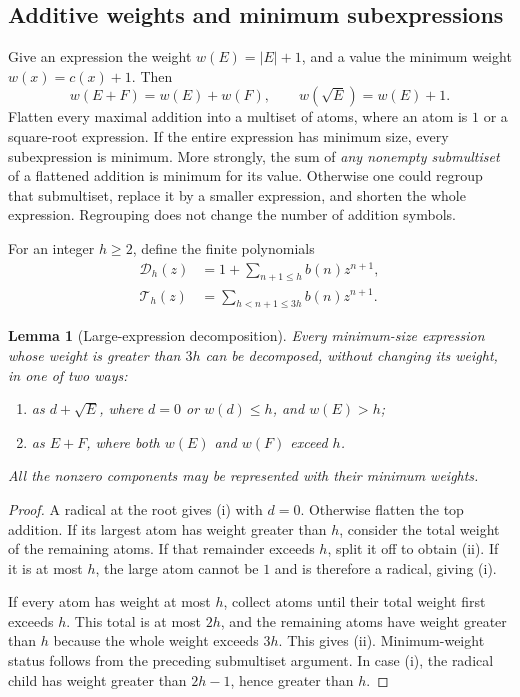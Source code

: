 \documentclass[11pt,letterpaper]{article}
\numberwithin{equation}{section}
\newtheorem{lemma}[theorem]{Lemma}
\theoremstyle{definition}
\begin{document}
\subsection{Additive weights and minimum subexpressions}

Give an expression the weight $w(E)=|E|+1$, and a value the minimum weight
$w(x)=c(x)+1$. Then
\[
 w(E+F)=w(E)+w(F),\qquad w(\sqrt E)=w(E)+1.
\]
Flatten every maximal addition into a multiset of atoms, where an atom is
$1$ or a square-root expression.
If the entire expression has minimum size, every subexpression is minimum.
More strongly, the sum of \emph{any nonempty submultiset} of a flattened
addition is minimum for its value. Otherwise one could regroup that
submultiset, replace it by a smaller expression, and shorten the whole
expression. Regrouping does not change the number of addition symbols.

For an integer $h\ge2$, define the finite polynomials
\begin{align}
 \mathcal D_h(z)&=1+\sum_{n+1\le h}b(n)z^{n+1},\label{eq:Dh}\\
 \mathcal T_h(z)&=\sum_{h<n+1\le3h}b(n)z^{n+1}.\label{eq:Th}
\end{align}

\begin{lemma}[Large-expression decomposition]\label{lem:decompose}
Every minimum-size expression whose weight is greater than $3h$ can be
decomposed, without changing its weight, in one of two ways:
\begin{enumerate}[label=(\roman*),itemsep=2pt]
\item as $d+\sqrt E$, where $d=0$ or $w(d)\le h$, and $w(E)>h$;
\item as $E+F$, where both $w(E)$ and $w(F)$ exceed $h$.
\end{enumerate}
All the nonzero components may be represented with their minimum weights.
\end{lemma}
\begin{proof}
A radical at the root gives (i) with $d=0$.
Otherwise flatten the top addition. If its largest atom has weight greater
than $h$, consider the total weight of the remaining atoms. If that remainder
exceeds $h$, split it off to obtain (ii). If it is at most $h$, the large atom
cannot be $1$ and is therefore a radical, giving (i).

If every atom has weight at most $h$, collect atoms until their total weight
first exceeds $h$. This total is at most $2h$, and the remaining atoms have
weight greater than $h$ because the whole weight exceeds $3h$. This gives
(ii). Minimum-weight status follows from the preceding submultiset argument.
In case (i), the radical child has weight greater than $2h-1$, hence greater
than $h$.
\end{proof}
\end{document}
